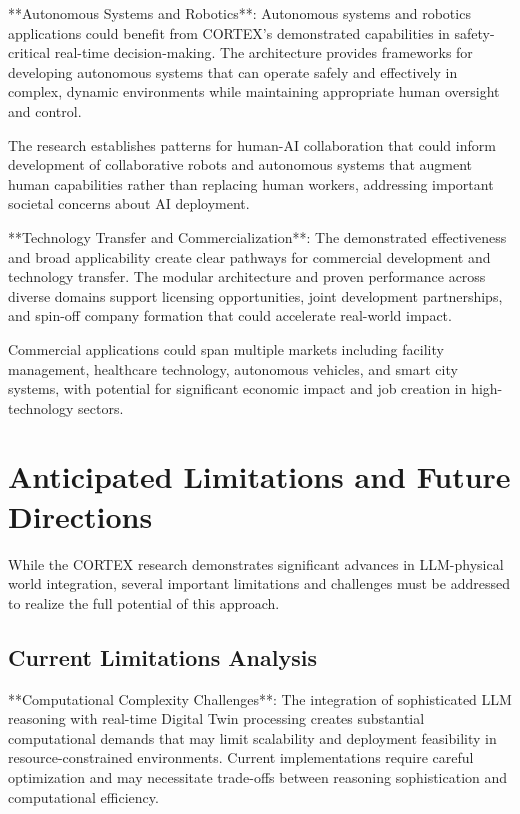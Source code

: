 **Autonomous Systems and Robotics**:
Autonomous systems and robotics applications could benefit from CORTEX's demonstrated capabilities in safety-critical real-time decision-making. The architecture provides frameworks for developing autonomous systems that can operate safely and effectively in complex, dynamic environments while maintaining appropriate human oversight and control.

The research establishes patterns for human-AI collaboration that could inform development of collaborative robots and autonomous systems that augment human capabilities rather than replacing human workers, addressing important societal concerns about AI deployment.

**Technology Transfer and Commercialization**:
The demonstrated effectiveness and broad applicability create clear pathways for commercial development and technology transfer. The modular architecture and proven performance across diverse domains support licensing opportunities, joint development partnerships, and spin-off company formation that could accelerate real-world impact.

Commercial applications could span multiple markets including facility management, healthcare technology, autonomous vehicles, and smart city systems, with potential for significant economic impact and job creation in high-technology sectors.

\section{Anticipated Limitations and Future Directions}

While the CORTEX research demonstrates significant advances in LLM-physical world integration, several important limitations and challenges must be addressed to realize the full potential of this approach.

\subsection{Current Limitations Analysis}

**Computational Complexity Challenges**:
The integration of sophisticated LLM reasoning with real-time Digital Twin processing creates substantial computational demands that may limit scalability and deployment feasibility in resource-constrained environments. Current implementations require careful optimization and may necessitate trade-offs between reasoning sophistication and computational efficiency.

